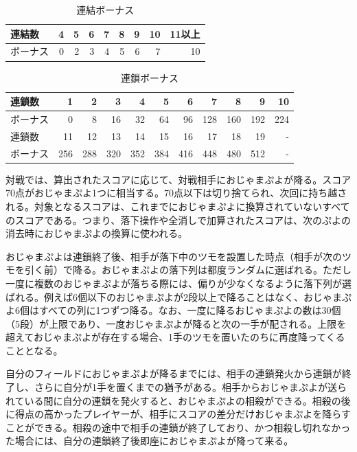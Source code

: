 \documentclass[12pt]{jarticle}
\begin{document}
\begin{table}[htb]
\begin{center}
\caption{連結ボーナス} \label{tab:connect_bonus}
\begin{tabular}{|l|r|r|r|r|r|r|r|r|} \hline
連結数 & 4 & 5 & 6 & 7 & 8 & 9 & 10 & 11以上\\ \hline
ボーナス & 0 & 2 & 3 & 4 & 5 & 6 & 7 & 10\\ \hline
\end{tabular}
\end{center}
\end{table}

\begin{table}[htb]
\begin{center}
\caption{連鎖ボーナス} \label{tab:chain_bonus}
\begin{tabular}{|l|r|r|r|r|r|r|r|r|r|r|} \hline
連鎖数 & 1 & 2 & 3 & 4 & 5 & 6 & 7 & 8 & 9 & 10\\ \hline
ボーナス & 0 & 8 & 16 & 32 & 64 & 96 & 128 & 160 & 192 & 224\\ \hline
連鎖数 & 11 & 12 & 13 & 14 & 15 & 16 & 17 & 18 & 19 & -\\ \hline
ボーナス & 256 & 288 & 320 & 352 & 384 & 416 & 448 & 480 & 512 & -\\ \hline
\end{tabular}
\end{center}
\end{table}

対戦では、算出されたスコアに応じて、対戦相手におじゃまぷよが降る。スコア70点がおじゃまぷよ1つに相当する。70点以下は切り捨てられ、次回に持ち越される。対象となるスコアは、これまでにおじゃまぷよに換算されていないすべてのスコアである。つまり、落下操作や全消しで加算されたスコアは、次のぷよの消去時におじゃまぷよの換算に使われる。

おじゃまぷよは連鎖終了後、相手が落下中のツモを設置した時点（相手が次のツモを引く前）で降る。おじゃまぷよの落下列は都度ランダムに選ばれる。ただし一度に複数のおじゃまぷよが落ちる際には、偏りが少なくなるように落下列が選ばれる。例えば6個以下のおじゃまぷよが2段以上で降ることはなく、おじゃまぷよ6個はすべての列に1つずつ降る。なお、一度に降るおじゃまぷよの数は30個（5段）が上限であり、一度おじゃまぷよが降ると次の一手が配される。上限を超えておじゃまぷよが存在する場合、1手のツモを置いたのちに再度降ってくることとなる。

自分のフィールドにおじゃまぷよが降るまでには、相手の連鎖発火から連鎖が終了し、さらに自分が1手を置くまでの猶予がある。相手からおじゃまぷよが送られている間に自分の連鎖を発火すると、おじゃまぷよの相殺ができる。相殺の後に得点の高かったプレイヤーが、相手にスコアの差分だけおじゃまぷよを降らすことができる。相殺の途中で相手の連鎖が終了しており、かつ相殺し切れなかった場合には、自分の連鎖終了後即座におじゃまぷよが降って来る。
\end{document}
